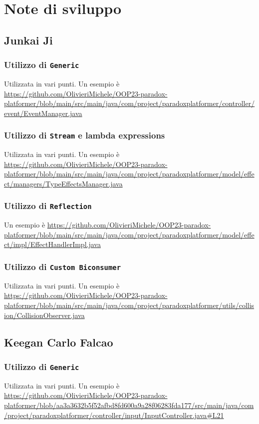 \documentclass[a4paper,12pt]{report}
\begin{document}
	\section{Note di sviluppo}
	
	
	\subsection{Junkai Ji}
	
	\subsubsection{Utilizzo di \texttt{Generic}}
	Utilizzata in vari punti.
	Un esempio è 
	\url{https://github.com/OlivieriMichele/OOP23-paradox-platformer/blob/main/src/main/java/com/project/paradoxplatformer/controller/event/EventManager.java}
	
	\subsubsection{Utilizzo di \texttt{Stream} e lambda expressions}
	Utilizzata in vari punti.
	Un esempio è 
	\url{https://github.com/OlivieriMichele/OOP23-paradox-platformer/blob/main/src/main/java/com/project/paradoxplatformer/model/effect/managers/TypeEffectsManager.java}
	
	\subsubsection{Utilizzo di \texttt{Reflection}}
	Un esempio è 
	\url{https://github.com/OlivieriMichele/OOP23-paradox-platformer/blob/main/src/main/java/com/project/paradoxplatformer/model/effect/impl/EffectHandlerImpl.java}
	
	\subsubsection{Utilizzo di \texttt{Custom Biconsumer}}
	Utilizzata in vari punti.
	Un esempio è 
	\url{https://github.com/OlivieriMichele/OOP23-paradox-platformer/blob/main/src/main/java/com/project/paradoxplatformer/utils/collision/CollisionObserver.java}
	
	\subsection{Keegan Carlo Falcao}
	
	\subsubsection{Utilizzo di \texttt{Generic}}
	Utilizzata in vari punti.
	Un esempio è
	\url{https://github.com/OlivieriMichele/OOP23-paradox-platformer/blob/aa3a3632b5f52afbd8fd600a9a28f06283fda177/src/main/java/com/project/paradoxplatformer/controller/input/InputController.java#L21}
	
\end{document}
